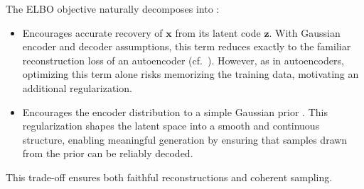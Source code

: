 The ELBO objective naturally decomposes into :
\begin{itemize}
    \item {} Encourages accurate recovery of $\mathbf{x}$ from its latent code $\mathbf{z}$. With Gaussian encoder and decoder assumptions, this term reduces exactly to the familiar reconstruction loss of an autoencoder (cf.\ ). However, as in autoencoders, optimizing this term alone risks memorizing the training data, motivating an additional regularization.
    \item {} Encourages the encoder distribution  to  a simple Gaussian prior . This regularization shapes the latent space into a smooth and continuous structure, enabling meaningful generation by ensuring that samples drawn from the prior can be reliably decoded.
\end{itemize}
This trade-off ensures both faithful reconstructions and coherent sampling.

